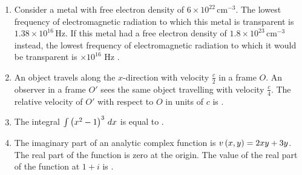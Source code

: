 \documentclass[journal,12pt,twocolumn]{IEEEtran}
\theoremstyle{remark}
\begin{document}
\begin{enumerate}[start=27]
    \item 
    Consider a metal with free electron density of $6 \times 10^{22} \, \text{cm}^{-3}$. The lowest frequency of electromagnetic radiation to which this metal is transparent is $1.38 \times 10^{16} \, \text{Hz}$. If this metal had a free electron density of $1.8 \times 10^{23} \, \text{cm}^{-3}$ instead, the lowest frequency of electromagnetic radiation to which it would be transparent is $\times 10^{16}$ Hz .
    
    \item
    An object travels along the $x$-direction with velocity $\frac{c}{2}$ in a frame $O$. An observer in a frame $O\prime$ sees the same object travelling with velocity $\frac{c}{4}$. The relative velocity of $O\prime$ with respect to $O$ in units of $c$ is  .
    
    \item 
    The integral $\int \left(x^2 - 1\right)^3 \, dx$ is equal to .

    \item 
    The imaginary part of an analytic complex function is $v\left(x, y\right) = 2xy + 3y$. The real part of the function is zero at the origin. The value of the real part of the function at $1 + i$ is  .






 
\end{enumerate}
\end{document}
